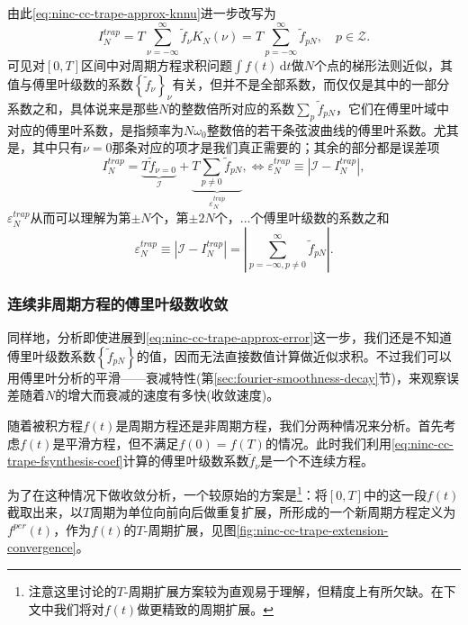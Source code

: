 由此\eqref{eq:ninc-cc-trape-approx-knnu}进一步改写为
\begin{equation*}
  I_{N}^{trap} = T \sum_{\nu = -\infty}^{\infty}
  \tilde{f}_{\nu} K_{N} \left( \nu \right) = T \sum_{p = - \infty}^{\infty} \tilde{f}_{p N}, \quad p \in \mathcal{Z}.
\end{equation*}
可见对$[0,T]$区间中对周期方程求积问题$\int f(t) \, \mathrm{d} t$做$N$个点的梯形法则近似，其值与傅里叶级数的系数$\left\{ \tilde{f}_{\nu} \right\}_{\nu}$有关，但并不是全部系数，而仅仅是其中的一部分系数之和，具体说来是那些$N$的整数倍所对应的系数$\sum_{p} \tilde{f}_{p N}$，它们在傅里叶域中对应的傅里叶系数，是指频率为$N \omega_{0}$整数倍的若干条弦波曲线的傅里叶系数。尤其是，其中只有$\nu = 0$那条对应的项才是我们真正需要的；其余的部分都是误差项
\begin{equation*}
  I_{N}^{trap} =
  \underbrace{
  T \tilde{f}_{\nu = 0}
  }_{\mathcal{I}}
   +
   \underbrace{
   T \sum_{ p \neq 0} \tilde{f}_{p N}
   }_{\varepsilon_{N}^{trap}}, \Leftrightarrow \varepsilon_{N}^{trap} \equiv \left| \mathcal{I} - I_{N}^{trap} \right|,
\end{equation*}
$\varepsilon_{N}^{trap}$从而可以理解为第$\pm N$个，第$\pm 2N$个，$\ldots$个傅里叶级数的系数之和
\begin{equation}
  \label{eq:ninc-cc-trape-approx-error}
  \varepsilon_{N}^{trap} \equiv \left| \mathcal{I} - I_{N}^{trap} \right| = \left| \sum_{p = - \infty, p \neq 0}^{\infty} \tilde{f}_{p N} \right|.
\end{equation}

\subsubsection{连续非周期方程的傅里叶级数收敛}
\label{sec:ninc-cc-trapezoidao-convergence}

同样地，分析即使进展到\eqref{eq:ninc-cc-trape-approx-error}这一步，我们还是不知道傅里叶级数系数$\left\{ \tilde{f}_{p N}\right\}$的值，因而无法直接数值计算做近似求积。不过我们可以用傅里叶分析的平滑——衰减特性(第\ref{sec:fourier-smoothness-decay}节)，来观察误差随着$N$的增大而衰减的速度有多快(收敛速度)。

随着被积方程$f(t)$是周期方程还是非周期方程，我们分两种情况来分析。首先考虑$f(t)$是平滑方程，但不满足$f(0)=f(T)$的情况。此时我们利用\eqref{eq:ninc-cc-trape-fsynthesis-coef}计算的傅里叶级数系数$\tilde{f}_{\nu}$是一个不连续方程。

为了在这种情况下做收敛分析，一个较原始的方案是\footnote{注意这里讨论的$T$-周期扩展方案较为直观易于理解，但精度上有所欠缺。在下文中我们将对$f(t)$做更精致的周期扩展。}：将$[0,T]$中的这一段$f(t)$截取出来，以$T$周期为单位向前向后做重复扩展，所形成的一个新周期方程定义为$f^{per}(t)$，作为$f(t)$的$T$-周期扩展，见图\ref{fig:ninc-cc-trape-extension-convergence}。

